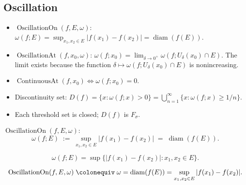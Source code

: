 
\subsection{Oscillation}
\label{sec:oscillation}

\begin{tcolorbox}[title={Toolkit --- Oscillation}]
\begin{itemize}
  \item $\operatorname{OscillationOn}(f,E,\omega)$:
    $\omega(f;E)=\sup_{x_1,x_2\in E}|f(x_1)-f(x_2)|=\operatorname{diam}(f(E))$.
  \item $\operatorname{OscillationAt}(f,x_0,\omega)$:
    $\omega(f;x_0)=\lim_{\delta\to 0^+}\omega(f;U_\delta(x_0)\cap E)$.
    The limit exists because the function $\delta\mapsto\omega(f;U_\delta(x_0)\cap E)$
    is nonincreasing.
  \item $\operatorname{ContinuousAt}(f,x_0)\iff\omega(f;x_0)=0$.
  \item Discontinuity set: $D(f)=\{x:\omega(f;x)>0\}=
    \bigcup_{n=1}^\infty\{x:\omega(f;x)\geq 1/n\}$.
  \item Each threshold set is closed; $D(f)$ is $F_\sigma$.
\end{itemize}
\end{tcolorbox}


\begin{tcolorbox}[title={Definition --- Oscillation on a Set}]
\begin{definition}
\label{def:oscillation-on-a-set}
$\operatorname{OscillationOn}(f,E,\omega)$:
\[
  \omega(f;E) \;:=\; \sup_{x_1,x_2\in E}|f(x_1)-f(x_2)|
  \;=\; \operatorname{diam}(f(E)).
\]
\end{definition}
\end{tcolorbox}

\begin{remark*}
\[
  \omega(f;E)
  = \sup\{|f(x_1)-f(x_2)|:x_1,x_2\in E\}.
\]
\end{remark*}

\begin{remark*}
\[
  \operatorname{OscillationOn}(f,E,\omega)
  \;\colonequiv\;
  \omega = \operatorname{diam}(f(E))
  = \sup_{x_1,x_2\in E}|f(x_1)-f(x_2)|.
\]
\end{remark*}

